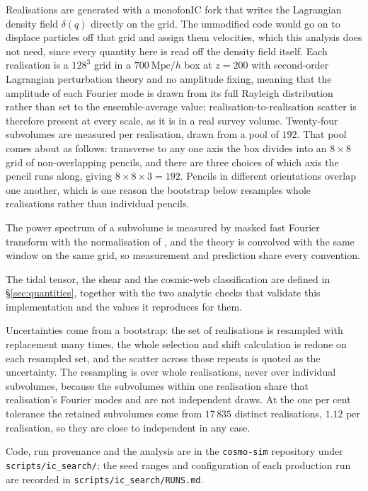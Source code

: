 \documentclass[12pt]{article}
\newcommand{\Mpch}{\ \mathrm{Mpc}/h}
\begin{document}
Realisations are generated with a monofonIC fork that writes the Lagrangian
density field $\delta(q)$ directly on the grid. The unmodified code would go on
to displace particles off that grid and assign them velocities, which this
analysis does not need, since every quantity here is read off the density field
itself. Each realisation is a $128^3$ grid in a $700\Mpch$ box at $z = 200$ with
second-order Lagrangian perturbation theory and no amplitude fixing, meaning
that the amplitude of each Fourier mode is drawn from its full Rayleigh
distribution rather than set to the ensemble-average value; realisation-to-realisation
scatter is therefore present at every scale, as it is in a real survey volume.
Twenty-four subvolumes are measured per realisation, drawn from a pool of $192$.
That pool comes about as follows: transverse to any one axis the box divides
into an $8 \times 8$ grid of non-overlapping pencils, and there are three
choices of which axis the pencil runs along, giving $8 \times 8 \times 3 = 192$.
Pencils in different orientations overlap one another, which is one reason the
bootstrap below resamples whole realisations rather than individual pencils.

The power spectrum of a subvolume is measured by masked fast Fourier transform
with the normalisation of \citet{Park1994}, and the theory is convolved with the
same window on the same grid, so measurement and prediction share every
convention.

The tidal tensor, the shear and the cosmic-web classification are defined in
\S\ref{sec:quantities}, together with the two analytic checks that validate this
implementation and the values it reproduces for them.

Uncertainties come from a bootstrap: the set of realisations is resampled with
replacement many times, the whole selection and shift calculation is redone on
each resampled set, and the scatter across those repeats is quoted as the
uncertainty. The resampling is over whole realisations, never over individual
subvolumes, because the subvolumes within one realisation share that
realisation's Fourier modes and are not independent draws. At the one per cent
tolerance the retained subvolumes come from $17\,835$ distinct realisations,
$1.12$ per realisation, so they are close to independent in any case.

{\sloppy
Code, run provenance and the analysis are in the \texttt{cosmo-sim} repository
under \texttt{scripts/ic\_search/}; the seed ranges and configuration of each
production run are recorded in \texttt{scripts/ic\_search/RUNS.md}.
\par}
\end{document}
